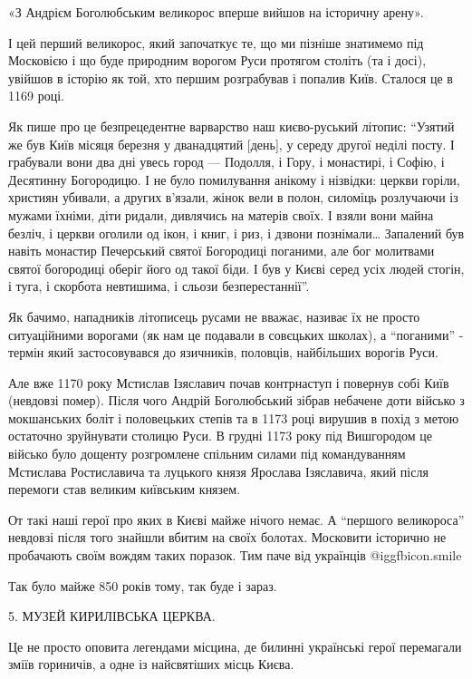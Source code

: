 «З Андрієм Боголюбським великорос вперше вийшов на історичну арену». 

І цей перший великорос, який започаткує те, що ми пізніше знатимемо під
Московією і що буде природним ворогом Руси протягом століть (та і досі),
увійшов в історію як той, хто першим розграбував і попалив Київ. Сталося це в
1169 році.

Як пише про це безпрецедентне варварство наш києво-руський літопис: \enquote{Узятий же
був Київ місяця березня у дванадцятий [день], у середу другої неділі посту. І
грабували вони два дні увесь город — Подолля, і Гору, і монастирі, і Софію, і
Десятинну Богородицю. І не було помилування анікому і нізвідки: церкви горіли,
християн убивали, а других в’язали, жінок вели в полон, силоміць розлучаючи із
мужами їхніми, діти ридали, дивлячись на матерів своїх. І взяли вони майна
безліч, і церкви оголили од ікон, і книг, і риз, і дзвони познімали… Запалений
був навіть монастир Печерський святої Богородиці поганими, але бог молитвами
святої богородиці оберіг його од такої біди. І був у Києві серед усіх людей
стогін, і туга, і скорбота невтишима, і сльози безперестаннії}. 

Як бачимо, нападників літописець русами не вважає, називає їх не просто
ситуаційними ворогами (як нам це подавали в совєцьких школах), а
\enquote{поганими} - термін який застосовувався до язичників, половців,
найбільших ворогів Руси. 

Але вже 1170 року Мстислав Ізяславич почав контрнаступ і повернув собі Київ
(невдовзі помер). Після чого Андрій Боголюбський зібрав небачене доти військо з
мокшанських боліт і половецьких степів та в 1173 році вирушив в похід з метою
остаточно зруйнувати столицю Руси. В грудні 1173 року під Вишгородом це військо
було дощенту розгромлене спільним силами під командуванням Мстислава
Ростиславича та луцького князя Ярослава Ізяславича, який після перемоги став
великим київським князем. 

От такі наші герої про яких в Києві майже нічого немає. А \enquote{першого
великороса} невдовзі після того знайшли вбитим на своїх болотах. Московити
історично не пробачають своїм вождям таких поразок. Тим паче від українців  @igg{fbicon.smile}   

Так було майже 850 років тому, так буде і зараз.

5. МУЗЕЙ КИРИЛІВСЬКА ЦЕРКВА.

Це не просто оповита легендами місцина, де билинні українські герої перемагали
зміїв гориничів, а одне із найсвятіших місць Києва.

